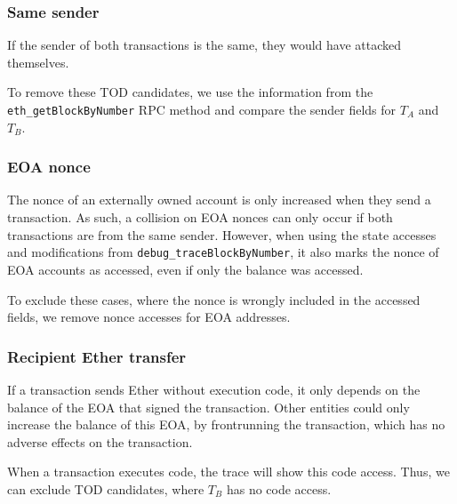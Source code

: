 \documentclass[draft,final]{vutinfth} %
\begin{document}
\subsubsection{Same sender}

If the sender of both transactions is the same, they would have attacked themselves.

To remove these TOD candidates, we use the information from the \verb|eth_getBlockByNumber| RPC method and compare the sender fields for $T_A$ and $T_B$.

\subsubsection{EOA nonce}


The nonce of an externally owned account is only increased when they send a transaction. As such, a collision on EOA nonces can only occur if both transactions are from the same sender. However, when using the state accesses and modifications from \verb|debug_traceBlockByNumber|, it also marks the nonce of EOA accounts as accessed, even if only the balance was accessed.

To exclude these cases, where the nonce is wrongly included in the accessed fields, we remove nonce accesses for EOA addresses.

\subsubsection{Recipient Ether transfer}

If a transaction sends Ether without execution code, it only depends on the balance of the EOA that signed the transaction. Other entities could only increase the balance of this EOA, by frontrunning the transaction, which has no adverse effects on the transaction.

When a transaction executes code, the trace will show this code access. Thus, we can exclude TOD candidates, where $T_B$ has no code access.

\end{document}
